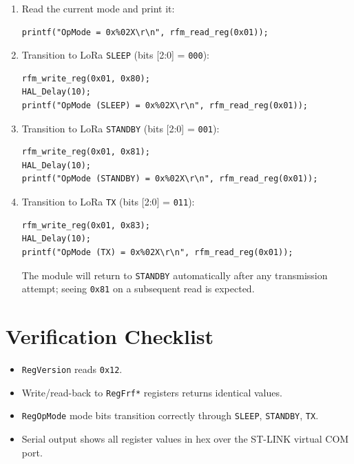 \documentclass[11pt,letterpaper]{article}
\begin{document}
\begin{enumerate}[leftmargin=2em]
	\item Read the current mode and print it:
\begin{verbatim}
printf("OpMode = 0x%02X\r\n", rfm_read_reg(0x01));
\end{verbatim}
	\item Transition to LoRa \texttt{SLEEP} (bits [2:0] = \texttt{000}):
\begin{verbatim}
rfm_write_reg(0x01, 0x80);
HAL_Delay(10);
printf("OpMode (SLEEP) = 0x%02X\r\n", rfm_read_reg(0x01));
\end{verbatim}
	\item Transition to LoRa \texttt{STANDBY} (bits [2:0] = \texttt{001}):
\begin{verbatim}
rfm_write_reg(0x01, 0x81);
HAL_Delay(10);
printf("OpMode (STANDBY) = 0x%02X\r\n", rfm_read_reg(0x01));
\end{verbatim}
	\item Transition to LoRa \texttt{TX} (bits [2:0] = \texttt{011}):
\begin{verbatim}
rfm_write_reg(0x01, 0x83);
HAL_Delay(10);
printf("OpMode (TX) = 0x%02X\r\n", rfm_read_reg(0x01));
\end{verbatim}
	The module will return to \texttt{STANDBY} automatically after any transmission attempt; seeing \texttt{0x81} on a subsequent read is expected.
\end{enumerate}

\section{Verification Checklist}
\begin{itemize}[leftmargin=2em]
	\item[$\square$] \texttt{RegVersion} reads \texttt{0x12}.
	\item[$\square$] Write/read-back to \texttt{RegFrf*} registers returns identical values.
	\item[$\square$] \texttt{RegOpMode} mode bits transition correctly through \texttt{SLEEP}, \texttt{STANDBY}, \texttt{TX}.
	\item[$\square$] Serial output shows all register values in hex over the ST-LINK virtual COM port.
\end{itemize}
\end{document}
